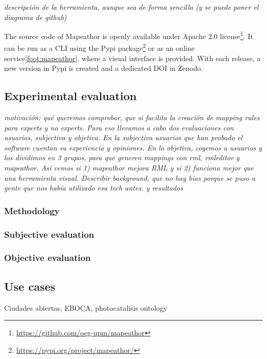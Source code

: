 \textit{descripción de la herramienta, aunque sea de forma sencilla (y se puede poner el diagrama de github)}

The source code of Mapeathor is openly available under Apache 2.0 license\footnote{\url{https://github.com/oeg-upm/mapeathor}}. It can be run as a CLI using the Pypi package\footnote{\url{https://pypi.org/project/mapeathor/}} or as an online service\cref{foot:mapeathor}, where a visual interface is provided. With each release, a new version in Pypi is created and a dedicated DOI in Zenodo. 


\subsection{Experimental evaluation}

\textit{motivación: qué queremos comprobar, que si facilita la creación de mapping rules para experts y no experts. Para eso llevamos a cabo dos evaluaciones con usuarios, subjectiva y objetiva. En la subjectiva usuarios que han probado el software cuentan su experiencia y opiniones. En la objetiva, cogemos a usuarios y los dividimos en 3 grupos, para que generen mappings con rml, rmleditor y mapeathor. Así vemos si 1) mapeathor mejora RML y si 2) funciona mejor que una herramienta visual. Describir background, que no hay bias porque se puso a gente que nos había utilizado esa tech antes. y resultados}

\subsubsection{Methodology}

\subsubsection{Subjective evaluation}

\subsubsection{Objective evaluation}



\subsection{Use cases}
Ciudades abiertas, EBOCA, photocatalisis ontology